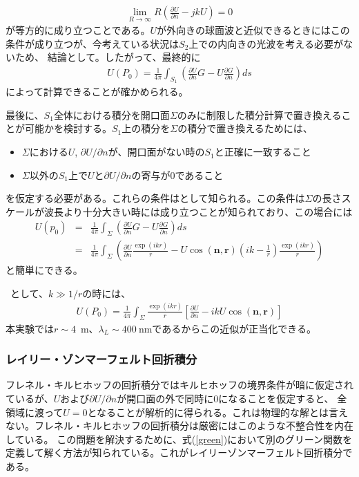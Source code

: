 \documentclass[a4paper,11pt,uplatex]{jsbook}
\begin{document}
\begin{eqnarray}
  \lim_{R\rightarrow \infty} R\left(\frac{\partial U}{\partial n} -jkU \right) = 0
\end{eqnarray}
が等方的に成り立つことである。$U$が外向きの球面波と近似できるときにはこの条件が成り立つが、今考えている状況は$S_2$上での内向きの光波を考える必要がないため、
結論として。したがって、最終的に
\begin{eqnarray}
  U(P_0) = \frac{1}{4\pi}\int_{S_1} \left( \frac{\partial U}{\partial n} G - U\frac{\partial G}{\partial n}  \right) ds
\end{eqnarray}
によって計算できることが確かめられる。

最後に、$S_1$全体における積分を開口面$\Sigma$のみに制限した積分計算で置き換えることが可能かを検討する。$S_1$上の積分を$\Sigma$の積分で置き換えるためには、
\begin{itemize}
  \item $\Sigma$における$U$, $\partial U/\partial n$が、開口面がない時の$S_1$と正確に一致すること
  \item $\Sigma$以外の$S_1$上で$U$と$\partial U/\partial n$の寄与が0であること
\end{itemize}
を仮定する必要がある。これらの条件はとして知られる。この条件は$\Sigma$の長さスケールが波長より十分大きい時には成り立つことが知られており、この場合には
\begin{eqnarray}
  U(p_0) &=& \frac{1}{4\pi}\int_\Sigma \left( \frac{\partial U}{\partial n}G - U \frac{\partial G}{\partial n}\right)ds \\
  &=& \frac{1}{4\pi} \int_\Sigma \left( \frac{\partial U}{\partial n}\frac{\exp(ikr)}{r} - U \cos(\bm{n},\bm{r})\left(ik - \frac{1}{r}\right)\frac{\exp(ikr)}{r}\right)
\end{eqnarray}
と簡単にできる。

~として、$k \gg 1/r$の時には、
\begin{eqnarray}
  U(P_0) = \frac{1}{4\pi}\int_\Sigma \frac{\exp(ikr)}{r}\left[\frac{\partial U}{\partial n} - ik U \cos(\bm{n},\bm{r})\right]
\end{eqnarray}
本実験では$r\sim 4$~m、$\lambda_L \sim 400~$nmであるからこの近似が正当化できる。

\subsubsection{レイリー・ゾンマーフェルト回折積分}
フレネル・キルヒホッフの回折積分ではキルヒホッフの境界条件が暗に仮定されているが、$U$および$\partial U/\partial n$が開口面の外で同時に0になることを仮定すると、
全領域に渡って$U=0$となることが解析的に得られる。これは物理的な解とは言えない。フレネル・キルヒホッフの回折積分は厳密にはこのような不整合性を内在している。
この問題を解決するために、式(\ref{green})において別のグリーン関数を定義して解く方法が知られている。これがレイリーゾンマーフェルト回折積分である。
\end{document}
